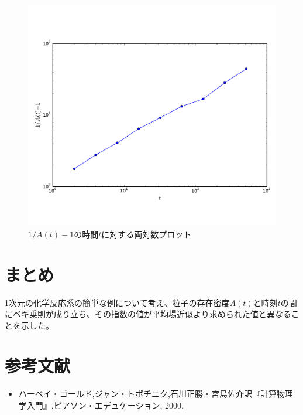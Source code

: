 \documentclass{jsarticle}
\begin{document}
\begin{enumerate}
\begin{enumerate}
                    \begin{figure}[H]
                        \begin{center}
                            \includegraphics[width=12.5cm]{figure_1.pdf}
                            \caption{$1/A(t)-1$の時間$t$に対する両対数プロット}
                            \label{fig:12-16-f1}
                        \end{center}
                    \end{figure}
                    
                \end{enumerate}    
            
        \end{enumerate}
    
    \section{まとめ}
        
        1次元の化学反応系の簡単な例について考え、粒子の存在密度$A(t)$と時刻$t$の間にベキ乗則が成り立ち、その指数の値が平均場近似より求められた値と異なることを示した。
    
    \section{参考文献}
        \begin{itemize}
            \item ハーベイ・ゴールド,ジャン・トボチニク,石川正勝・宮島佐介訳『計算物理学入門』,ピアソン・エデュケーション, 2000.
        \end{itemize}
\end{document}

